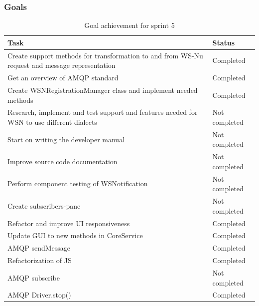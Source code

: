 \subsubsection{Goals}
\label{subsec:project_lifecycle-development-sprint_5-goals}

\begin{table}[ht!]
\small
\centering
\begin{tabular}{ | p{10cm} | p{2cm} |}
\hline
 \rowcolor{lightgray}
 \textbf{Task} & \textbf{Status} \\
\hline
\rowcolor{green!30}
Create support methods for transformation to and from WS-Nu request and message representation & Completed \\
\rowcolor{green!30}
Get an overview of AMQP standard & Completed \\
\rowcolor{green!30}
Create WSNRegistrationManager class and implement needed methods & Completed \\
\rowcolor{orange!40}
Research, implement and test support and features needed for WSN to use different dialects	& Not completed \\
\rowcolor{orange!40}
Start on writing the developer manual & Not completed \\
\rowcolor{orange!40}
Improve source code documentation & Not completed \\
\rowcolor{orange!40}
Perform component testing of WSNotification	& Not completed \\
\rowcolor{orange!40}
Create subscribers-pane	& Not completed \\
\rowcolor{green!30}
Refactor and improve UI responsiveness & Completed \\
\rowcolor{green!30}
Update GUI to new methods in CoreService & Completed \\
\rowcolor{green!30}
AMQP sendMessage & Completed \\
\rowcolor{green!30}
Refactorization of JS & Completed \\
\rowcolor{orange!40}
AMQP subscribe & Not completed \\
\rowcolor{green!30}
AMQP Driver.stop() & Completed \\
\hline
\end{tabular}
\caption{Goal achievement for sprint 5}
\label{tab:sprint 5, goals}
\end{table}

